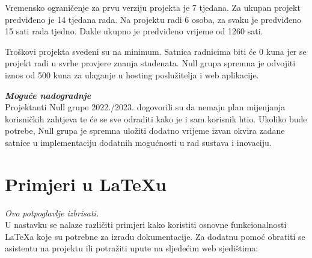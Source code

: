 \texttt{}{
Vremensko ograničenje za prvu verziju projekta je 7 tjedana. Za ukupan projekt predviđeno je 14 tjedana rada. Na projektu radi 6 osoba, za svaku je predviđeno 15 sati rada tjedno. Dakle ukupno je predviđeno vrijeme od 1260 sati. 
}
\newline


\texttt{}{
Troškovi projekta svedeni su na minimum. Satnica radnicima biti će 0 kuna jer se projekt radi u svrhe provjere znanja studenata. Null grupa spremna je odvojiti iznos od 500 kuna za ulaganje u hosting poslužitelja i web aplikacije.
}



         \textbf{\textit{Moguće nadogradnje}}\\

\texttt{}{
Projektanti Null grupe 2022./2023. dogovorili su da nemaju plan mijenjanja korisničkih zahtjeva te će se sve odraditi kako je i sam korisnik htio. Ukoliko bude potrebe, Null grupa je spremna uložiti dodatno vrijeme izvan okvira zadane satnice u implementaciju dodatnih mogućnosti u rad sustava i inovaciju. 
}



        
		\section{Primjeri u \LaTeX u}
		
		\textit{Ovo potpoglavlje izbrisati.}\\

		U nastavku se nalaze različiti primjeri kako koristiti osnovne funkcionalnosti \LaTeX a koje su potrebne za izradu dokumentacije. Za dodatnu pomoć obratiti se asistentu na projektu ili potražiti upute na sljedećim web sjedištima:
		
		
		


		
				

